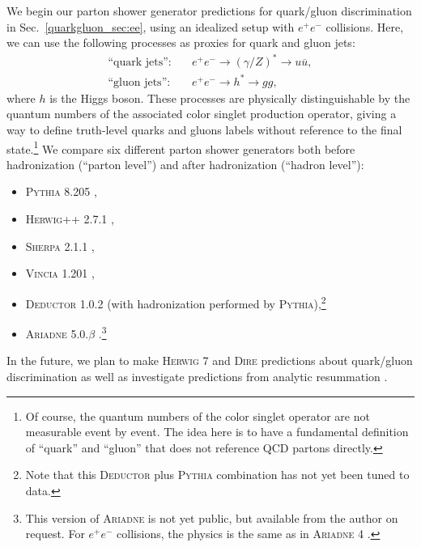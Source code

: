 \documentclass[11pt]{cernrep}
\begin{document}
We begin our parton shower generator predictions for quark/gluon discrimination in Sec.~\ref{quarkgluon_sec:ee}, using an idealized setup with $e^+e^-$ collisions.  Here, we can use the following processes as proxies for quark and gluon jets:
\begin{align}
\text{``quark jets''}: \quad & e^+e^- \to (\gamma/Z)^* \to u \overline{u}, \\
\text{``gluon jets''}: \quad & e^+e^- \to h^* \to g g,
\end{align}
where $h$ is the Higgs boson.  These processes are physically
distinguishable by the quantum numbers of the associated color singlet
production operator, giving a way to define truth-level quarks and
gluons labels without reference to the final state.\footnote{Of course, the quantum numbers of the color singlet operator are not measurable event by event.  The idea here is to have a fundamental definition of ``quark'' and ``gluon'' that does not reference QCD partons directly.}  We
compare six different parton shower generators both before
hadronization (``parton level'') and after hadronization (``hadron
level''):
\begin{itemize}
\item \textsc{Pythia 8.205} \cite{Sjostrand:2006za,Sjostrand:2014zea},
\item \textsc{Herwig++ 2.7.1} \cite{Bahr:2008pv,Bellm:2013hwb},
\item \textsc{Sherpa 2.1.1} \cite{Gleisberg:2008ta},
\item \textsc{Vincia 1.201} \cite{Giele:2013ema},
\item \textsc{Deductor 1.0.2} \cite{Nagy:2014mqa} (with hadronization performed by \textsc{Pythia}),\footnote{Note that this
\textsc{Deductor} plus \textsc{Pythia} combination has not yet been tuned to data.}
\item \textsc{Ariadne 5.0.$\beta$} \cite{Flensburg:2011kk}.\footnote{This version of \textsc{Ariadne} is not yet public, but available from the author on request.  For $e^+ e^-$ collisions, the physics is the same as in \textsc{Ariadne 4} \cite{Lonnblad:1992tz}.}
\end{itemize}
In the future, we plan to make \textsc{Herwig 7} \cite{Bellm:2015jjp} and \textsc{Dire} \cite{Hoche:2015sya} predictions about quark/gluon discrimination as well as investigate predictions from analytic resummation \cite{Larkoski:2013eya,Larkoski:2014pca}.
\end{document}
